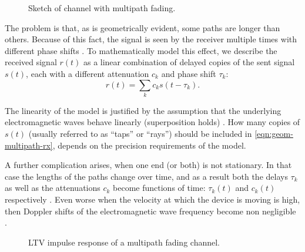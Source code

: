\begin{figure}
	\centering
	
	\caption{
		Sketch of channel with multipath fading.
		\label{fig:multipath-sketch}
	}
\end{figure}

The problem is that, as is geometrically evident, some paths are longer than others. Because of this fact, the signal is seen by the receiver multiple times with different phase shifts \cite{Gallager,Messier}. To mathematically model this effect, we describe the received signal \(r(t)\) as a linear combination of delayed copies of the sent signal \(s(t)\), each with a different attenuation \(c_k\) and phase shift \(\tau_k\):
\begin{equation} \label{eqn:geom-multipath-rx}
	r(t) = \sum_k c_k s(t - \tau_k).
\end{equation}

The linearity of the model is justified by the assumption that the underlying electromagnetic waves behave linearly (superposition holds) \cite{Gallager}. How many copies of \(s(t)\) (usually referred to as ``taps'' or ``rays'') should be included in \eqref{eqn:geom-multipath-rx}, depends on the precision requirements of the model.

A further complication arises, when one end (or both) is not stationary. In that case the lengths of the paths change over time, and as a result both the delays \(\tau_k\) as well as the attenuations \(c_k\) become functions of time: \(\tau_k(t)\) and \(c_k(t)\) respectively \cite{Gallager,Messier}. Even worse when the velocity at which the device is moving is high, then Doppler shifts of the electromagnetic wave frequency become non negligible \cite{Gallager}.

\begin{figure}
	\centering
	
	\caption{
		LTV impulse response of a multipath fading channel.
		\label{fig:multipath-impulse-response}
	}
\end{figure}


